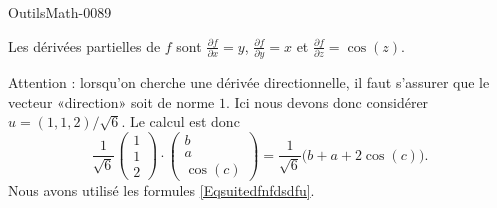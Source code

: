 
\begin{corrige}{OutilsMath-0089}

    Les dérivées partielles de $f$ sont $\frac{ \partial f }{ \partial x }=y$, $\frac{ \partial f }{ \partial y }=x$ et $\frac{ \partial f }{ \partial z }=\cos(z)$.

    Attention : lorsqu'on cherche une dérivée directionnelle, il faut s'assurer que le vecteur «direction» soit de norme $1$. Ici nous devons donc considérer $u=(1,1,2)/\sqrt{6}$. Le calcul est donc
    \begin{equation}
        \frac{1}{ \sqrt{6} }\begin{pmatrix}
            1    \\ 
            1    \\ 
            2    
        \end{pmatrix}\cdot\begin{pmatrix}
            b    \\ 
            a    \\ 
            \cos(c)    
        \end{pmatrix}=\frac{1}{ \sqrt{6} }\big(b+a+2\cos(c)\big).
    \end{equation}
    Nous avons utilisé les formules \eqref{Eqsuitedfnfdsdfu}.

\end{corrige}
